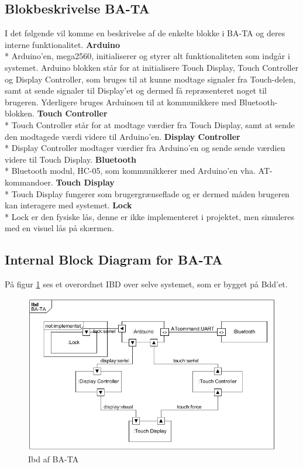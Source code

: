 \subsection{Blokbeskrivelse BA-TA}
I det følgende vil komme en beskrivelse af de enkelte blokke i BA-TA og deres interne funktionalitet.
\newline
\newline
\textbf{Arduino} \\*
Arduino'en, mega2560, initialiserer og styrer alt funktionaliteten som indgår i systemet. Arduino blokken står for at initialisere  Touch Display, Touch Controller og Display Controller, som bruges til at kunne modtage signaler fra Touch-delen, samt at sende signaler til Display'et og dermed få repræsenteret noget til brugeren. Yderligere bruges Arduinoen til at kommunikkere med Bluetooth-blokken.
\newline
\newline
\textbf{Touch Controller} \\*
Touch Controller står for at modtage værdier fra Touch Display, samt at sende den modtagede værdi videre til Arduino'en. 
\newline
\newline
\textbf{Display Controller} \\*
Display Controller modtager værdier fra Arduino'en og sende sende værdien videre til Touch Display. \newline
\newline
\textbf{Bluetooth} \\*
Bluetooth modul, HC-05, som kommunikkerer med Arduino'en vha. AT-kommandoer.
\newline
\newline
\textbf{Touch Display} \\*
Touch Display fungerer som brugergrænseflade og er dermed måden brugeren kan interagere med systemet. 
\newline
\newline
\textbf{Lock} \\*
Lock er den fysiske lås, denne er ikke implementeret i projektet, men simuleres med en visuel lås på skærmen. 
\subsection{Internal Block Diagram for BA-TA}
På figur \ref{fig:Ibd} ses et overordnet IBD over selve systemet, som er bygget på Bdd'et. 
\begin{figure}[H]
	\centering
	\includegraphics[width = 300 pt]{Img/Ibd.png}
	\caption{Ibd af BA-TA}
	\label{fig:Ibd}
\end{figure}



